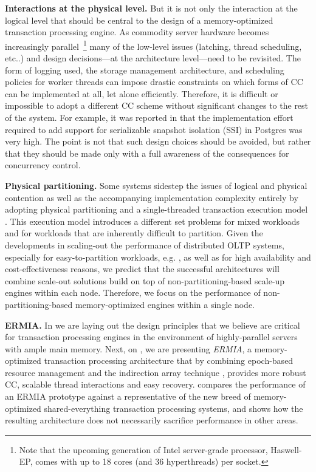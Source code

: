 \vspace{2mm}
{\bf Interactions at the physical level.} 
But it is not only the interaction at the logical level that should be central to the design of a memory-optimized transaction processing engine. As commodity server hardware becomes increasingly parallel~\footnote{Note that the upcoming generation of Intel server-grade processor, Haswell-EP, comes with up to 18 cores (and 36 hyperthreads) per socket.} many of the low-level issues (latching, thread scheduling, etc..) and design decisions---at the architecture level---need to be revisited. The form of logging used, the storage management architecture, and scheduling policies for worker threads can impose drastic constraints on which forms of CC can be implemented at all, let alone efficiently. 
Therefore, it is difficult or impossible to adopt a different CC scheme without significant changes to the rest of the system. 
For example, it was reported in \cite{PortsG12} that the implementation effort required to add support for serializable snapshot isolation (SSI) in Postgres was very high. 
The point is not that such design choices should be avoided, but rather that they should be made only with a full awareness of the consequences for concurrency control. 

\vspace{2mm}
{\bf Physical partitioning.} Some systems sidestep the issues of logical and physical contention as well as the accompanying implementation complexity entirely by adopting physical partitioning and a single-threaded transaction execution model \cite{Kallman+08,KemperN11}. This execution model introduces a different set problems for mixed workloads and for workloads that are inherently difficult to partition.  Given the developments in scaling-out the performance of distributed OLTP systems, especially for easy-to-partition workloads, e.g. \cite{Corbett+12,BailisFHGS14,ThomsonA10}, as well as for high availability and cost-effectiveness reasons, we predict that the successful architectures will combine scale-out solutions build on top of non-partitioning-based scale-up engines within each node.
Therefore, we focus on the performance of non-partitioning-based memory-optimized engines within a single node.

\vspace{2mm}
{\bf ERMIA.} 
In  we are laying out the design principles that we believe are critical for transaction processing engines in the environment of highly-parallel servers with ample main memory. Next, on , we are presenting {\em ERMIA}, a memory-optimized transaction processing architecture that by combining epoch-based resource management and the indirection array technique \cite{SadoghiRCB13}, provides more robust CC, scalable thread interactions and easy recovery.  
 compares the performance of an ERMIA prototype against a representative of the new breed of memory-optimized shared-everything transaction processing systems, and shows how the resulting architecture does not necessarily sacrifice performance in other areas.


